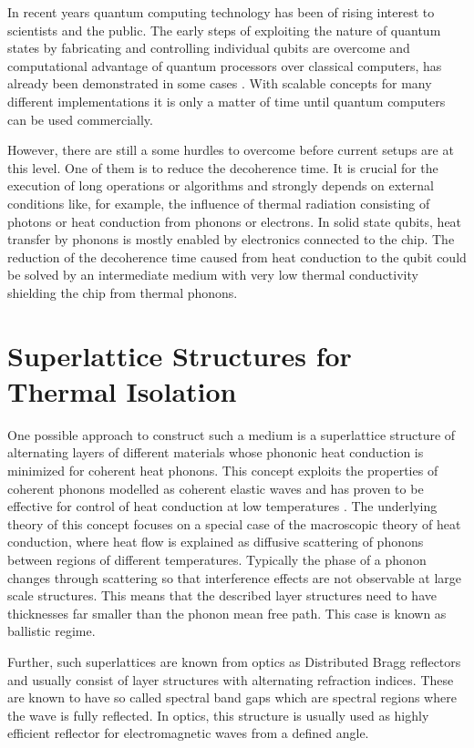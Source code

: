 In recent years quantum computing technology has been of rising
interest to scientists and the public. The early steps of exploiting the nature
of quantum states by fabricating and controlling individual qubits  are
overcome \cite{Leonard2019} and computational advantage of quantum processors
over
classical computers, has already been demonstrated in some cases
\cite{Arute2019}. With scalable concepts for many
different implementations \cite{Cirac2000} \cite{Brecht2016} \cite{Bluhm2019}
\cite{Lao2018}	it is only a matter of time until quantum computers can be used
commercially.

However, there are still a some hurdles to overcome before current setups are
at this level. One of them is to reduce the decoherence time. It is crucial for
the execution of long operations or algorithms and strongly
depends on external conditions like, for example, the influence of thermal
radiation consisting of photons or heat conduction from phonons or
electrons\cite{Ferraro2019}.
In solid state qubits, heat transfer by phonons is mostly
enabled by electronics connected to the chip.
The reduction of the decoherence time caused from heat conduction to the qubit
could be solved by an intermediate medium with very low thermal
conductivity shielding the chip from thermal phonons.

\section{Superlattice Structures for Thermal Isolation}
One possible approach to
construct such a medium is a superlattice structure of alternating layers of
different materials whose phononic heat conduction is minimized for coherent
heat phonons. This concept exploits
the properties of coherent phonons modelled as coherent elastic waves and has
proven to be effective for control of heat conduction at low temperatures
\cite{Luckyanova2012}. The underlying theory of this concept focuses on a
special case of the macroscopic theory of heat conduction, where heat flow is
explained as diffusive scattering of phonons between regions of different
temperatures.
Typically the phase of a phonon changes through scattering so that interference
effects are not observable at large scale structures. This means that the
described layer structures need to have thicknesses far smaller than
the phonon mean free path. This case is known as ballistic regime.

Further, such superlattices are known from optics as Distributed Bragg
reflectors and usually consist of layer structures with alternating refraction
indices. These are known to have so called spectral band gaps which are
spectral regions where the wave is fully reflected.
In optics, this structure is usually used as highly efficient reflector for
electromagnetic waves from a defined angle.

